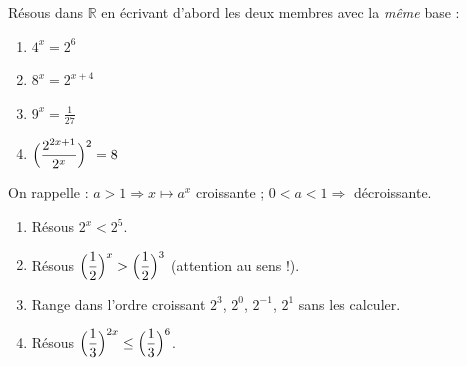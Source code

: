 \documentclass[11pt,a4paper]{article}
\newcommand{\R}{\mathbb{R}}
\newcommand{\ds}{\displaystyle}
\begin{document}
\begin{exo}
Résous dans $\R$ en écrivant d'abord les deux membres avec la \emph{même} base :
\begin{enumerate}[label=\alph*),leftmargin=2em,topsep=1pt,itemsep=1pt]
  \item $4^{x}=2^{6}$ \qquad
  \item $8^{x}=2^{x+4}$ \qquad
  \item $9^{x}=\ds\frac{1}{27}$ \qquad
  \item $\ds\Bigl(\frac{2^{2x+1}}{2^{x}}\Bigr)^{2}=8$
\end{enumerate}
\end{exo}

\begin{exo}
On rappelle : $a>1\Rightarrow x\mapsto a^{x}$ croissante ; $0<a<1\Rightarrow$ décroissante.
\begin{enumerate}[label=\alph*),leftmargin=2em,topsep=1pt,itemsep=1pt]
  \item Résous $2^{x}<2^{5}$.
  \item Résous $\ds\Bigl(\frac12\Bigr)^{x}>\Bigl(\frac12\Bigr)^{3}$ (attention au sens !).
  \item Range dans l'ordre croissant $2^{3}$, $2^{0}$, $2^{-1}$, $2^{1}$ sans les calculer.
  \item Résous $\ds\Bigl(\frac13\Bigr)^{2x}\leq \Bigl(\frac13\Bigr)^{6}$.
\end{enumerate}
\end{exo}
\end{document}
